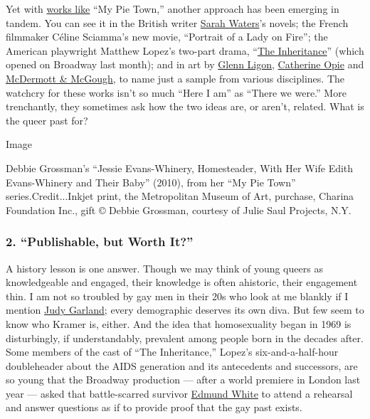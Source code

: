 Yet with
\href{https://lens.blogs.nytimes3xbfgragh.onion/2013/06/13/examining-identity-one-gender-at-a-time/}{works
like} ``My Pie Town,'' another approach has been emerging in tandem. You
can see it in the British writer
\href{https://www.nytimes3xbfgragh.onion/2015/10/16/t-magazine/my-10-favorite-books-sarah-waters.html}{Sarah
Waters}'s novels; the French filmmaker Céline Sciamma's new movie,
``Portrait of a Lady on Fire''; the American playwright Matthew Lopez's
two-part drama,
``\href{https://www.nytimes3xbfgragh.onion/2019/10/25/theater/the-inheritance-broadway.html}{The
Inheritance}'' (which opened on Broadway last month); and in art by
\href{https://www.nytimes3xbfgragh.onion/2018/06/18/t-magazine/glenn-ligon-adrian-piper-art.html}{Glenn
Ligon},
\href{https://www.nytimes3xbfgragh.onion/2019/10/02/t-magazine/catherine-opie.html}{Catherine
Opie} and
\href{https://www.nytimes3xbfgragh.onion/2019/09/16/t-magazine/peter-mcgough.html}{McDermott
\& McGough}, to name just a sample from various disciplines. The
watchcry for these works isn't so much ``Here I am'' as ``There we
were.'' More trenchantly, they sometimes ask how the two ideas are, or
aren't, related. What is the queer past for?

Image

Debbie Grossman's ``Jessie Evans-Whinery, Homesteader, With Her Wife
Edith Evans-Whinery and Their Baby'' (2010), from her ``My Pie Town''
series.Credit...Inkjet print, the Metropolitan Museum of Art, purchase,
Charina Foundation Inc., gift © Debbie Grossman, courtesy of Julie Saul
Projects, N.Y.

\hypertarget{2-publishable-but-worth-it}{%
\subsubsection{2. ``Publishable, but Worth
It?''}\label{2-publishable-but-worth-it}}

A history lesson is one answer. Though we may think of young queers as
knowledgeable and engaged, their knowledge is often ahistoric, their
engagement thin. I am not so troubled by gay men in their 20s who look
at me blankly if I mention
\href{https://www.nytimes3xbfgragh.onion/topic/person/judy-garland}{Judy
Garland}; every demographic deserves its own diva. But few seem to know
who Kramer is, either. And the idea that homosexuality began in 1969 is
disturbingly, if understandably, prevalent among people born in the
decades after. Some members of the cast of ``The Inheritance,'' Lopez's
six-and-a-half-hour doubleheader about the AIDS generation and its
antecedents and successors, are so young that the Broadway production
--- after a world premiere in London last year --- asked that
battle-scarred survivor
\href{https://www.nytimes3xbfgragh.onion/2018/06/26/t-magazine/edmund-white-queer-writing-book-influence.html}{Edmund
White} to attend a rehearsal and answer questions as if to provide proof
that the gay past exists.


